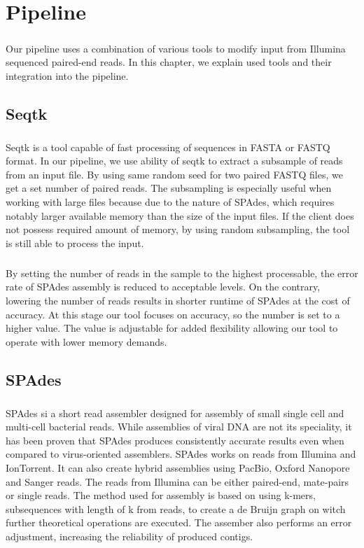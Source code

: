 \chapter{Pipeline}

\label{kap:pipeline} %
\paragraph*{}
Our pipeline uses a combination of various tools to modify input from Illumina sequenced paired-end reads. In this chapter, we explain used tools and their integration into the pipeline. 
\section{Seqtk}
\paragraph*{}
Seqtk is a tool capable of fast processing of sequences in FASTA or FASTQ format. In our pipeline, we use ability of seqtk to extract a subsample of reads from an input file. By using same random seed for two paired FASTQ files, we get a set number of paired reads. The subsampling is especially useful when working with large files because due to the nature of SPAdes, which requires notably larger available memory than the size of the input files. If the client does not possess required amount of memory, by using random subsampling, the tool is still able to process the input. 
\paragraph*{}
By setting the number of reads in the sample to the highest processable, the error rate of SPAdes assembly is reduced to acceptable levels. On the contrary, lowering the number of reads results in shorter runtime of SPAdes at the cost of accuracy. At this stage our tool focuses on accuracy, so the number is set to a higher value. The value is adjustable for added flexibility allowing our tool to operate with lower memory demands.

\section{SPAdes}
\paragraph*{}
SPAdes si a short read assembler designed for assembly of small single cell and multi-cell bacterial reads. While assemblies of viral DNA are not its speciality, it has been proven that SPAdes produces consistently accurate results even when compared to virus-oriented assemblers. SPAdes works on reads from Illumina and IonTorrent. It can also create hybrid assemblies using PacBio, Oxford Nanopore and Sanger reads. The reads from Illumina can be either paired-end, mate-pairs or single reads. The method used for assembly is based on using k-mers, subsequences with length of k from reads, to create a de Bruijn graph on witch further theoretical operations are executed. The assember also performs an error adjustment, increasing the reliability of produced contigs.
